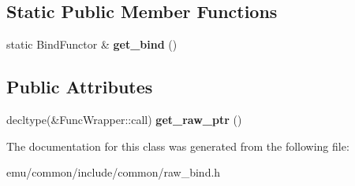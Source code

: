 \subsection*{Static Public Member Functions}
\begin{DoxyCompactItemize}
\item 
\mbox{\label{classscoped__raw__bind_a02040f659823c361f069dbeeee4394e0}} 
static Bind\+Functor \& {\bfseries get\+\_\+bind} ()
\end{DoxyCompactItemize}
\subsection*{Public Attributes}
\begin{DoxyCompactItemize}
\item 
\mbox{\label{classscoped__raw__bind_a4d04b3fe51355fe39d4631993c205c65}} 
decltype(\&Func\+Wrapper\+::call) {\bfseries get\+\_\+raw\+\_\+ptr} ()
\end{DoxyCompactItemize}


The documentation for this class was generated from the following file\+:\begin{DoxyCompactItemize}
\item 
emu/common/include/common/raw\+\_\+bind.\+h\end{DoxyCompactItemize}
